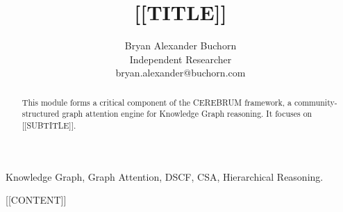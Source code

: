 \documentclass[10pt,journal,compsoc]{IEEEtran}
\begin{document}
\title{[[TITLE]]}
\author{Bryan Alexander Buchorn \\ Independent Researcher \\ bryan.alexander@buchorn.com}

\maketitle

\begin{abstract}
This module forms a critical component of the CEREBRUM framework, a community-structured graph attention engine for Knowledge Graph reasoning. It focuses on [[SUBTITLE]].
\end{abstract}

\begin{IEEEkeywords}
Knowledge Graph, Graph Attention, DSCF, CSA, Hierarchical Reasoning.
\end{IEEEkeywords}

[[CONTENT]]



\end{document}
